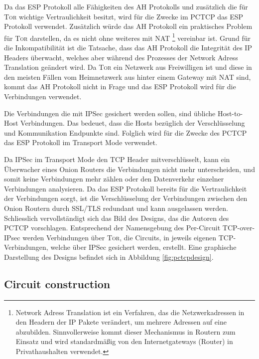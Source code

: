 \documentclass[fleqn,envcountsame,runningheads,10pt,a4paper]{llncs}
\begin{document}
Da das ESP Protokoll alle Fähigkeiten des AH Protokolls und zusätzlich die für \textsc{Tor} wichtige Vertraulichkeit besitzt, wird für die Zwecke im PCTCP das ESP Protokoll verwendet. Zusätzlich würde das AH Protokoll ein praktisches Problem für \textsc{Tor} darstellen, da es nicht ohne weiteres mit NAT \footnote{Network Adress Translation \cite{rfc:nat} ist ein Verfahren, das die Netzwerkadressen in den  Headern der IP Pakete verändert, um mehrere Adressen auf eine abzubilden. Sinnvollerweise kommt dieser Mechanismus in Routern zum Einsatz und wird standardmäßig von den Internetgateways (Router) in Privathaushalten verwendet.}  vereinbar ist. Grund für die Inkompatibilität ist die Tatsache, dass das AH Protokoll die Integrität des IP Headers überwacht, welches aber während des Prozesses der Network Adress Translation geändert wird. Da \textsc{Tor} ein Netzwerk aus Freiwilligen ist und diese in den meisten Fällen vom Heimnetzwerk aus hinter einem Gateway mit NAT sind, kommt das AH Protokoll nicht in Frage und das ESP Protokoll wird für die Verbindungen verwendet.

Die Verbindungen die mit IPSec gesichert werden sollen, sind übliche Host-to-Host Verbindungen. Das bedeuet, dass die Hosts bezüglich der Verschlüsselung und Kommunikation Endpunkte sind. Folglich wird für die Zwecke des PCTCP das ESP Protokoll im Transport Mode verwendet.

\newpage Da IPSec im Transport Mode den TCP Header mitverschlüsselt, kann ein Überwacher eines Onion Routers die Verbindungen nicht mehr unterscheiden, und somit keine Verbindungen mehr zählen oder den Datenverkehr einzelner Verbindungen analysieren. Da das ESP Protokoll bereits für die Vertraulichkeit der Verbindungen sorgt, ist die Verschlüsselung der Verbindungen zwischen den Onion Routern durch SSL/TLS redundant und kann ausgelassen werden. Schliesslich vervollständigt sich das Bild des Designs, das die Autoren des PCTCP vorschlagen. Entsprechend der Namensgebung des Per-Circuit TCP-over-IPsec werden Verbindungen über \textsc{Tor}, die Circuits, in jeweils eigenen TCP-Verbindungen, welche über IPSec gesichert werden, erstellt. Eine graphische Darstellung des Designs befindet sich in Abbildung \ref{fig:pctcpdesign}.

\subsection{Circuit construction}
\end{document}
